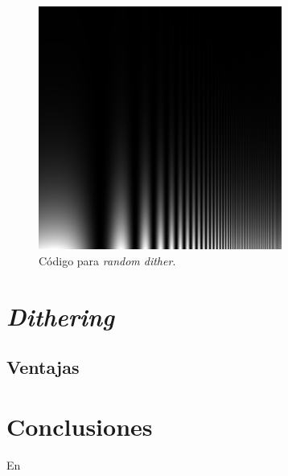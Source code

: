 \documentclass[conference]{IEEEtran}
\begin{document}
\begin{figure}[htbp]
\centerline{\includegraphics[width=80mm]{code/mtf}}
\caption{Código para \textit{random dither}.}
\label{randomPy}
\end{figure}


\section{\textit{Dithering}}
\textcolor{violet}{\lipsum[3]}

\subsection{Ventajas}
\textcolor{violet}{\lipsum[3]}





\section{Conclusiones}

En
\end{document}
